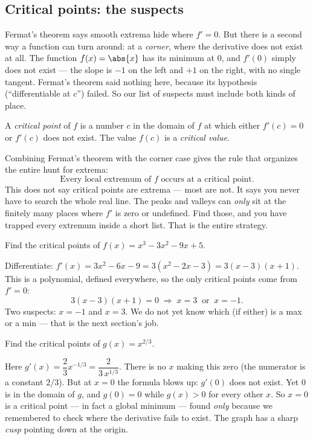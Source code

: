 \subsection{Critical points: the suspects}

Fermat's theorem says smooth extrema hide where $f'=0$. But there is a second way
a function can turn around: at a \emph{corner}, where the derivative does not
exist at all. The function $f(x)=\abs{x}$ has its minimum at $0$, and $f'(0)$
simply does not exist --- the slope is $-1$ on the left and $+1$ on the right, with
no single tangent. Fermat's theorem said nothing here, because its hypothesis
(``differentiable at $c$'') failed. So our list of suspects must include both kinds
of place.

\begin{definition}\label{ch16:def-critical}
A \emph{critical point} of $f$ is a number $c$ in the domain of $f$ at which either
$f'(c)=0$ or $f'(c)$ does not exist. The value $f(c)$ is a \emph{critical value}.
\end{definition}

\begin{focusbox}
Combining Fermat's theorem with the corner case gives the rule that organizes the
entire hunt for extrema:
\[
\boxed{\text{Every local extremum of } f \text{ occurs at a critical point.}}
\]
This does not say critical points are extrema --- most are not. It says you never
have to search the whole real line. The peaks and valleys can \emph{only} sit at
the finitely many places where $f'$ is zero or undefined. Find those, and you have
trapped every extremum inside a short list. That is the entire strategy.
\end{focusbox}

\begin{example}\label{ch16:ex-list-crit}
Find the critical points of $f(x)=x^3-3x^2-9x+5$.

\smallskip
Differentiate: $f'(x)=3x^2-6x-9=3(x^2-2x-3)=3(x-3)(x+1)$. This is a polynomial,
defined everywhere, so the only critical points come from $f'=0$:
\[
3(x-3)(x+1)=0 \;\Longrightarrow\; x=3 \ \text{ or } \ x=-1.
\]
Two suspects: $x=-1$ and $x=3$. We do not yet know which (if either) is a max or a
min --- that is the next section's job.
\end{example}

\begin{example}\label{ch16:ex-cusp}
Find the critical points of $g(x)=x^{2/3}$.

\smallskip
Here $g'(x)=\dfrac{2}{3}x^{-1/3}=\dfrac{2}{3\,x^{1/3}}$. There is no $x$ making
this zero (the numerator is a constant $2/3$). But at $x=0$ the formula blows up:
$g'(0)$ does not exist. Yet $0$ is in the domain of $g$, and $g(0)=0$ while
$g(x)>0$ for every other $x$. So $x=0$ is a critical point --- in fact a global
minimum --- found \emph{only} because we remembered to check where the derivative
fails to exist. The graph has a sharp \emph{cusp} pointing down at the origin.
\end{example}

